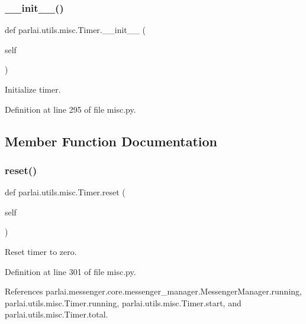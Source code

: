 \subsubsection{\texorpdfstring{\+\_\+\+\_\+init\+\_\+\+\_\+()}{\_\_init\_\_()}}
{\footnotesize\ttfamily def parlai.\+utils.\+misc.\+Timer.\+\_\+\+\_\+init\+\_\+\+\_\+ (\begin{DoxyParamCaption}\item[{}]{self }\end{DoxyParamCaption})}

\begin{DoxyVerb}Initialize timer.\end{DoxyVerb}
 

Definition at line 295 of file misc.\+py.



\subsection{Member Function Documentation}
\mbox{\label{classparlai_1_1utils_1_1misc_1_1Timer_a68bdf8abb3fe00edc639b21944d03371}} 
\subsubsection{\texorpdfstring{reset()}{reset()}}
{\footnotesize\ttfamily def parlai.\+utils.\+misc.\+Timer.\+reset (\begin{DoxyParamCaption}\item[{}]{self }\end{DoxyParamCaption})}

\begin{DoxyVerb}Reset timer to zero.\end{DoxyVerb}
 

Definition at line 301 of file misc.\+py.



References parlai.\+messenger.\+core.\+messenger\+\_\+manager.\+Messenger\+Manager.\+running, parlai.\+utils.\+misc.\+Timer.\+running, parlai.\+utils.\+misc.\+Timer.\+start, and parlai.\+utils.\+misc.\+Timer.\+total.

\mbox{\label{classparlai_1_1utils_1_1misc_1_1Timer_a855f1e8a3ba03fe16712fd7ae49dab46}} 
